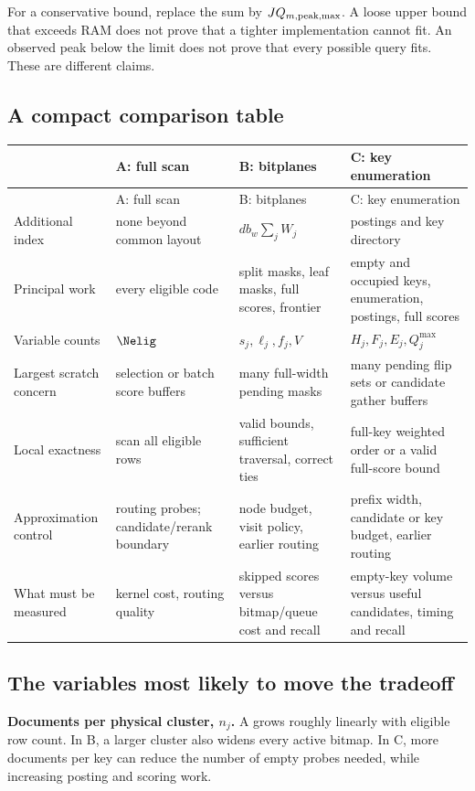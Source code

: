 For a conservative bound, replace the sum by $JQ_{m,\rm peak,max}$. A loose upper bound that
exceeds RAM does not prove that a tighter implementation cannot fit. An observed peak below
the limit does not prove that every possible query fits. These are different claims.

\subsection{A compact comparison table}
\small
\begin{longtable}{@{}P{.16\linewidth}P{.25\linewidth}P{.25\linewidth}P{.25\linewidth}@{}}
\toprule & A: full scan & B: bitplanes & C: key enumeration\\\midrule\endfirsthead
\toprule & A: full scan & B: bitplanes & C: key enumeration\\\midrule\endhead
Additional index & none beyond common layout & $d b_w\sum_jW_j$ & postings and key directory\\
Principal work & every eligible code & split masks, leaf masks, full scores, frontier & empty and occupied keys, enumeration, postings, full scores\\
Variable counts & $\Nelig$ & $s_j,\ell_j,f_j,V$ & $H_j,F_j,E_j,Q_j^{\max}$\\
Largest scratch concern & selection or batch score buffers & many full-width pending masks & many pending flip sets or candidate gather buffers\\
Local exactness & scan all eligible rows & valid bounds, sufficient traversal, correct ties & full-key weighted order or a valid full-score bound\\
Approximation control & routing probes; candidate/rerank boundary & node budget, visit policy, earlier routing & prefix width, candidate or key budget, earlier routing\\
What must be measured & kernel cost, routing quality & skipped scores versus bitmap/queue cost and recall & empty-key volume versus useful candidates, timing and recall\\\bottomrule
\end{longtable}
\normalsize

\subsection{The variables most likely to move the tradeoff}
\textbf{Documents per physical cluster, $n_j$.} A grows roughly linearly with eligible row
count. In B, a larger cluster also widens every active bitmap. In C, more documents per key can
reduce the number of empty probes needed, while increasing posting and scoring work.

